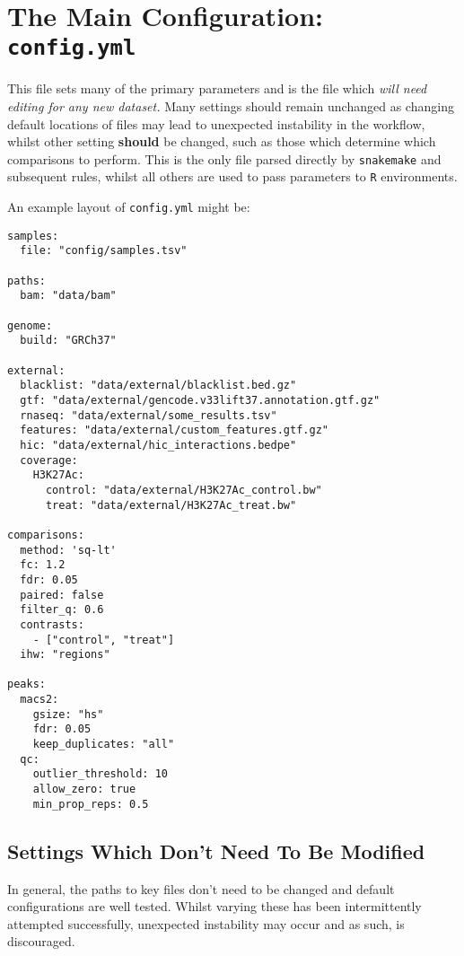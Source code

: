 \documentclass[
]{book}
\begin{document}
\hypertarget{config-yml}{%
\section{\texorpdfstring{The Main Configuration: \texttt{config.yml}}{The Main Configuration: config.yml}}\label{config-yml}}

This file sets many of the primary parameters and is the file which \emph{will need editing for any new dataset.}
Many settings should remain unchanged as changing default locations of files may lead to unexpected instability in the workflow, whilst other setting \textbf{should} be changed, such as those which determine which comparisons to perform.
This is the only file parsed directly by \texttt{snakemake} and subsequent rules, whilst all others are used to pass parameters to \texttt{R} environments.

An example layout of \texttt{config.yml} might be:

\begin{verbatim}
samples:
  file: "config/samples.tsv"

paths:
  bam: "data/bam"

genome:
  build: "GRCh37"

external:
  blacklist: "data/external/blacklist.bed.gz"
  gtf: "data/external/gencode.v33lift37.annotation.gtf.gz"
  rnaseq: "data/external/some_results.tsv"
  features: "data/external/custom_features.gtf.gz"
  hic: "data/external/hic_interactions.bedpe"
  coverage:
    H3K27Ac:
      control: "data/external/H3K27Ac_control.bw"
      treat: "data/external/H3K27Ac_treat.bw"

comparisons:
  method: 'sq-lt'
  fc: 1.2
  fdr: 0.05
  paired: false
  filter_q: 0.6
  contrasts:
    - ["control", "treat"]
  ihw: "regions"

peaks:
  macs2:
    gsize: "hs"
    fdr: 0.05
    keep_duplicates: "all"
  qc:
    outlier_threshold: 10
    allow_zero: true
    min_prop_reps: 0.5
\end{verbatim}

\hypertarget{settings-which-dont-need-to-be-modified}{%
\subsection*{Settings Which Don't Need To Be Modified}\label{settings-which-dont-need-to-be-modified}}

In general, the paths to key files don't need to be changed and default configurations are well tested.
Whilst varying these has been intermittently attempted successfully, unexpected instability may occur and as such, is discouraged.
\end{document}

